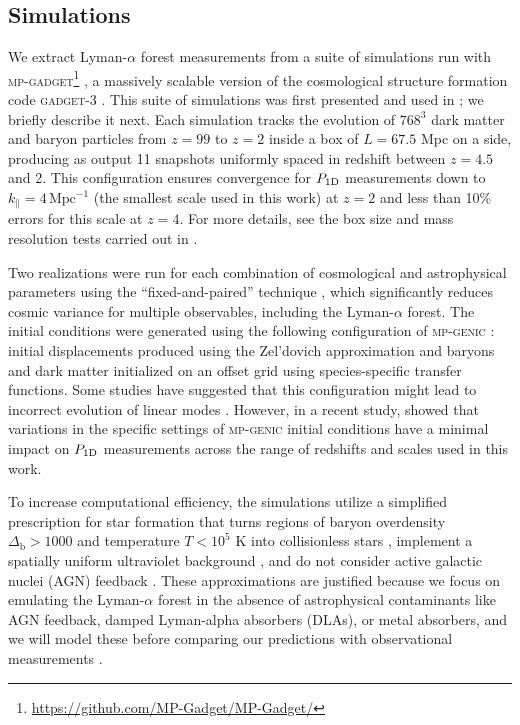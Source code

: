 \documentclass{aa}
\newcommand{\lyaf}{Lyman-$\alpha$ forest\xspace}
\newcommand{\poned}{\ensuremath{P_{\rm 1D}}\xspace}
\newcommand{\iMpc}{\ensuremath{\,\mathrm{Mpc}^{-1}}}
\begin{document}

\subsection{Simulations}
\label{sec:input_sims}

We extract \lyaf measurements from a suite of simulations run with \textsc{mp-gadget}\footnote{\url{https://github.com/MP-Gadget/MP-Gadget/}} \citep{feng2018MpGadgetMpGadgetTag, emugp_bird2019}, a massively scalable version of the cosmological structure formation code \textsc{gadget-3} \citep[last described in][]{Gadget_Springel}. This suite of simulations was first presented and used in \citet{Pedersen2021}; we briefly describe it next. Each simulation tracks the evolution of $768^3$ dark matter and baryon particles from $z=99$ to $z=2$ inside a box of $L = 67.5$ Mpc on a side, producing as output 11 snapshots uniformly spaced in redshift between $z=4.5$ and 2. This configuration ensures convergence for \poned measurements down to $k_\parallel=4\iMpc$ (the smallest scale used in this work) at $z=2$ and less than 10\% errors for this scale at $z=4$. For more details, see the box size and mass resolution tests carried out in \citet{bolton2017SherwoodSimulationSuite}.

Two realizations were run for each combination of cosmological and astrophysical parameters using the ``fixed-and-paired'' technique \citep{angulo2016CosmologicalNbodySimulations, pontzen2016InvertedInitialConditions}, which significantly reduces cosmic variance for multiple observables, including the \lyaf \citep{fixedpaired_Villaescusa, anderson2019CosmologicalHydrodynamicSimulations}. The initial conditions were generated using the following configuration of \textsc{mp-genic} \citep{Bird2020}: initial displacements produced using the Zel'dovich approximation and baryons and dark matter initialized on an offset grid using species-specific transfer functions. Some studies have suggested that this configuration might lead to incorrect evolution of linear modes \citep{Bird2020}. However, in a recent study, \citet{Khan2024} showed that variations in the specific settings of \textsc{mp-genic} initial conditions have a minimal impact on \poned measurements across the range of redshifts and scales used in this work.

To increase computational efficiency, the simulations utilize a simplified prescription for star formation that turns regions of baryon overdensity $\Delta_\mathrm{b}>1000$ and temperature $T<10^5$ K into collisionless stars \citep[e.g.;][]{viel2004ConstraintsPrimordialPower}, implement a spatially uniform ultraviolet background \citep{haardt2012RadiativeTransferClumpya}, and do not consider active galactic nuclei (AGN) feedback \citep[e.g.;][]{chabanier2020ImpactAGNFeedback}. These approximations are justified because we focus on emulating the \lyaf in the absence of astrophysical contaminants like AGN feedback, damped Lyman-alpha absorbers (DLAs), or metal absorbers, and we will model these before comparing our predictions with observational measurements \citep[e.g.;][]{mcdonald2005LinearTheoryPower, palanque-delabrouille2015ConstraintNeutrinoMasses, palanque-delabrouille2020HintsNeutrinoBounds}.
\end{document}
